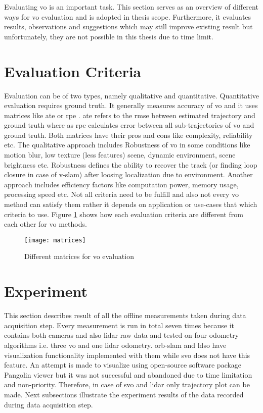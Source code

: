 Evaluating \acrshort{vo} is an important task. This section serves as an overview of different ways for \acrshort{vo} evaluation and is adopted in thesis scope. Furthermore, it evaluates results, observations and suggestions which may still improve existing result but unfortunately, they are not possible in this thesis due to time limit.
  
\section{Evaluation Criteria}
Evaluation can be of two types, namely qualitative and quantitative. Quantitative evaluation requires ground truth. It generally measures accuracy of \acrshort{vo} and it uses matrices like \acrfull{ate} or \acrfull{rpe} \cite{7782863}. \acrshort{ate} refers to the \acrshort{rmse} between estimated trajectory and ground truth where as \acrshort{rpe} calculates error between all sub-trajectories of \acrshort{vo} and ground truth. Both matrices have their pros and cons like complexity, reliability etc. The qualitative approach includes Robustness of \acrshort{vo} in some conditions like motion blur, low texture (less features) scene, dynamic environment, scene brightness etc. Robustness defines the ability to recover the track (or finding loop closure in case of \acrshort{v-slam}) after loosing localization due to environment. Another approach includes efficiency factors like computation power, memory usage, processing speed etc. Not all criteria need to be fulfill and also not every \acrshort{vo} method can satisfy them rather it depends on application or use-cases that which criteria to use. Figure \ref{fig:matrices} shows how each evaluation criteria are different from each other for \acrshort{vo} methods.     
\begin{figure}[H]
	\centering
	\texttt{[image: matrices]}
	\caption{Different matrices for \acrshort{vo} evaluation \cite{lecture}}
	\label{fig:matrices}
\end{figure}

\section{Experiment}
This section describes result of all the offline measurements taken during data acquisition step. Every measurement is run in total seven times because it contains both cameras and also \acrshort{lidar} raw data and tested on four odometry algorithms i.e. three \acrshort{vo} and one \acrshort{lidar} odometry. \acrshort{orb}-\acrshort{slam} and \acrshort{ldso} have visualization functionality implemented with them while \acrshort{svo} does not have this feature. An attempt is made to visualize using open-source software package Pangolin viewer but it was not successful and abandoned due to time limitation and non-priority. Therefore, in case of \acrshort{svo} and \acrshort{lidar} only trajectory plot can be made. Next subsections illustrate the experiment results of the data recorded during data acquisition step.

